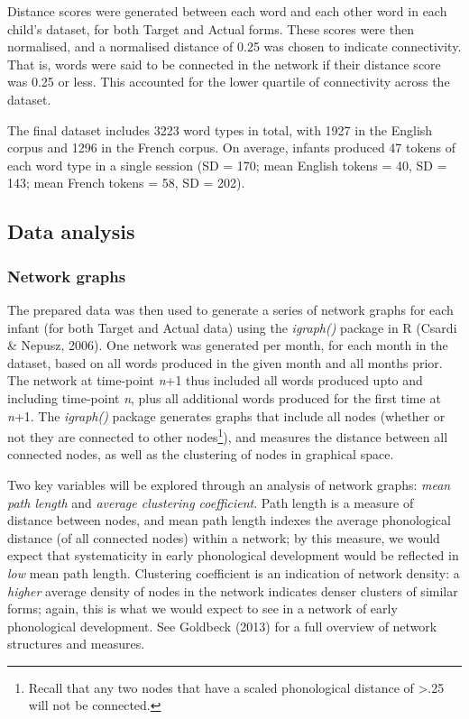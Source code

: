 \documentclass[
  man]{apa6}
\begin{document}
Distance scores were generated between each word and each other word in each child's dataset, for both Target and Actual forms. These scores were then normalised, and a normalised distance of 0.25 was chosen to indicate connectivity. That is, words were said to be connected in the network if their distance score was 0.25 or less. This accounted for the lower quartile of connectivity across the dataset.

The final dataset includes 3223 word types in total, with 1927 in the English corpus and 1296 in the French corpus. On average, infants produced 47 tokens of each word type in a single session (SD = 170; mean English tokens = 40, SD = 143; mean French tokens = 58, SD = 202).

\hypertarget{data-analysis}{%
\subsection{Data analysis}\label{data-analysis}}

\hypertarget{network-graphs}{%
\subsubsection{Network graphs}\label{network-graphs}}

The prepared data was then used to generate a series of network graphs for each infant (for both Target and Actual data) using the \emph{igraph()} package in R (Csardi \& Nepusz, 2006). One network was generated per month, for each month in the dataset, based on all words produced in the given month and all months prior. The network at time-point \emph{n}+1 thus included all words produced upto and including time-point \emph{n}, plus all additional words produced for the first time at \emph{n}+1. The \emph{igraph()} package generates graphs that include all nodes (whether or not they are connected to other nodes\footnote{Recall that any two nodes that have a scaled phonological distance of \textgreater.25 will not be connected.}), and measures the distance between all connected nodes, as well as the clustering of nodes in graphical space.

Two key variables will be explored through an analysis of network graphs: \emph{mean path length} and \emph{average clustering coefficient}. Path length is a measure of distance between nodes, and mean path length indexes the average phonological distance (of all connected nodes) within a network; by this measure, we would expect that systematicity in early phonological development would be reflected in \emph{low} mean path length. Clustering coefficient is an indication of network density: a \emph{higher} average density of nodes in the network indicates denser clusters of similar forms; again, this is what we would expect to see in a network of early phonological development. See Goldbeck (2013) for a full overview of network structures and measures.
\end{document}
